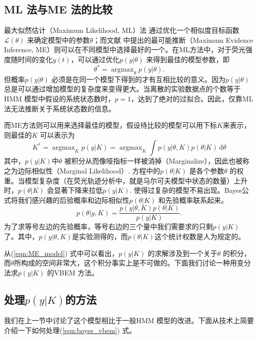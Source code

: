 \documentclass[11pt, a4paper]{article}
\DeclareMathOperator*{\argmax}{argmax}
\begin{document}
    \subsection{ML 法与ME 法的比较}
    最大似然估计（Maximum Likelihood, ML）法\cite{wiki:mle} 通过优化一个相似度目标函数$\mathcal L(\theta)$ 来确定模型中的参数$\theta$；而文献\cite{VBEM} 中提出的最可能推断（Maximum Evidence Inference, ME）则可以在不同模型中选择最好的一个。在ML方法中，对于荧光强度随时间的变化$y(t)$，可以通过优化$p(y|\theta)$ 来得到最佳的模型参数，即
    \begin{equation}\label{eqn:ML_estimate}
      \theta^* = \argmax_\theta p(y| \theta).
    \end{equation}
    但概率$p(y|\theta)$ 必须是在同一个模型下得到的才有互相比较的意义。因为$p(y|\theta)$ 总是可以通过增加模型的复杂度来变得更大。当离散的实验数据点的个数等于HMM 模型中假设的系统状态数时，$p=1$，达到了绝对的过拟合。因此，仅靠ML 法无法推断关于系统状态数的信息。

    而ME方法则可以用来选择最佳的模型，假设待比较的模型可以用下标$K$来表示，则最佳的$K$ 可以表示为
    \begin{equation}\label{eqn:ME_model}
      K^* = \argmax_K p(y| K) = \argmax_K \int p(y| \theta, K)p(\theta| K)\,\mathrm d\theta
    \end{equation}
    其中，$p(y| K)$中$\theta$ 被积分从而像哑指标一样被消掉（Marginalize），因此也被称之为边际相似性（Marginal Likelihood）. 方程中的$p(\theta | K)$ 是各个参数$\theta$ 的权重。当模型复杂度（在荧光轨迹分析中，就是马尔可夫模型中状态的数量）上升时，$p(\theta | K)$ 会显著下降来拉低$p(y| K)$. 使得过复杂的模型不易出现。Bayes公式将我们感兴趣的后验概率和边际相似性$p(\theta| K)$ 和先验概率联系起来。
    \begin{equation}\label{eqn:bayes_vbem}
      p(\theta| y, K) = \frac{p(y| \theta, K)p(\theta| K)}{p(y| K)}.
    \end{equation}
    为了求等号左边的先验概率，等号右边的三个量中我们需要求的只剩$p(y| K)$ 了。其中，$p(y| \theta, K)$是实验测得的，而$p(\theta| K)$这个统计权数是人为规定的。

    从(\ref{eqn:ME_model}) 式中可以看出，$p(y|K)$ 的求解涉及到一个关于$\theta$ 的积分，而$\theta$所构成的空间非常大，这个积分事实上是不可做的。下面我们讨论一种用变分法求$p(y|K)$ 的VBEM 方法。

    \subsection{处理$p(y|K)$的方法}
    我们在上一节中讨论了这个模型相比于一般HMM 模型的改进。下面从技术上简要介绍一下如何处理(\ref{eqn:bayes_vbem}) 式。
\end{document}
